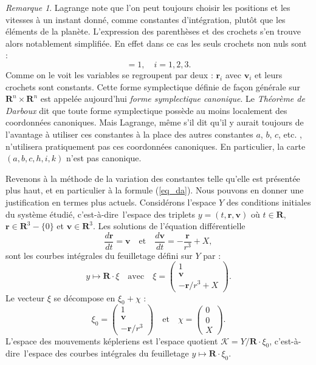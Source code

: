 \documentclass[12pt,paperletter, reqno]{amsart}
\newcommand{\rr}{\mathbf{r}}
\newcommand{\vv}{\mathbf{v}}
\newcommand{\RR}{\mathbf{R}}
\newcommand{\cad}{c'est-\`a-dire}
\theoremstyle{plain}
\theoremstyle{remark}
\newtheorem*{remarque*}{Remarque}
\begin{document}
  \begin{remarque*}
    Lagrange note que l'on peut toujours choisir les positions et les vitesses à un instant donné,
    comme constantes d'intégration,
    plutôt que les éléments de la planète.
    L'expression des parenthèses et des crochets s'en trouve alors notablement simplifiée.
    En effet dans ce cas les seuls crochets non nuls sont :
    \begin{equation}
      [\vv_i,\rr_i] = 1, \quad i=1,2,3.
    \end{equation}
    Comme on le voit les variables se regroupent par deux :
    $\rr_i$ avec $\vv_i$ et leurs crochets sont constants.
    Cette forme symplectique définie de façon générale sur $\RR^n\times\RR^n$ est appelée aujourd'hui \emph{forme symplectique canonique}.
    Le \emph{Théorème de Darboux} dit que toute forme symplectique possède au moins localement des coordonnées canoniques.
    Mais Lagrange,
    même s'il dit qu'\og il y aurait toujours de l'avantage à utiliser ces constantes à la place des autres constantes $a$, $b$, $c$, etc.\fg{} \cite[volume II, page 76]{Lagrange1},
    n'utilisera pratiquement pas ces coordonnées canoniques.
    En particulier,
    la carte $(a,b,c,h,i,k)$ n'est pas canonique.
  \end{remarque*}
  
  Revenons à la méthode de la variation des constantes telle qu'elle est présentée plus haut,
  et en particulier à la formule (\ref{eq_da}).
  Nous pouvons en donner une justification en termes plus actuels.
  Considérons l'espace $Y$ des conditions initiales du système étudié,
  \cad\ l'espace des triplets $y=(t,\rr,\vv)$ où $t\in \RR$,
  $\rr\in \RR^3-\{0\}$ et $\vv\in \RR^3$.
  Les solutions de l'équation différentielle
  \begin{equation}
    \frac{d\rr}{dt} = \vv \quad \mbox{et} \quad \frac{d\vv}{dt} = - \frac{\rr}{r^3} +X,
  \end{equation}
  sont les courbes intégrales du feuilletage défini sur $Y$ par :
  \begin{equation}
    y\mapsto \RR\cdot\xi \quad \mbox{avec}\quad \xi= \begin{pmatrix} 1 \\ \vv \\ -\rr/r^3+X \end{pmatrix}.
  \end{equation}
  Le vecteur $\xi$ se décompose en $\xi_0 + \chi$ :
  \begin{equation}
    \xi_0 = \begin{pmatrix} 1 \\ \vv \\ -\rr/r^3 \end{pmatrix} \quad \mbox{et} \quad \chi = \begin{pmatrix} 0 \\ 0 \\ X \end{pmatrix}.
  \end{equation}
  L'espace des mouvements képleriens est l'espace quotient $\mathcal{K}=Y/\RR\cdot\xi_0$,
  \cad\ l'espace des courbes intégrales du feuilletage $y\mapsto \RR\cdot\xi_0$.
  
\end{document}
